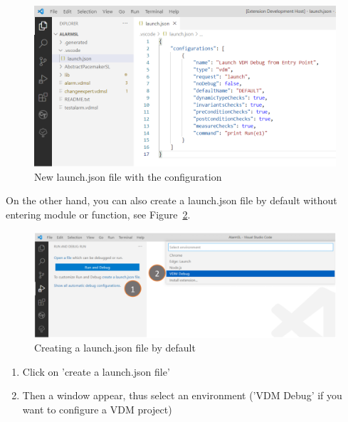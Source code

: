 \documentclass{overturerepchap}
\begin{document}
\begin{figure}[htp]
\begin{center}
  \includegraphics[width=460px]{snapshots/New .json file with the VDM Run Configuration.png}
  \caption{New launch.json file with the configuration}
  \label{fig:userguide:new.jsonFile}
\end{center}
\end{figure}

\cleardoublepage
On the other hand, you can also create a launch.json file by default without entering module or function, see Figure~\ref{fig:userguide:DefaultLaunch.json}.

\begin{figure}[htp]
\begin{center}
  \includegraphics[width=460px]{snapshots/Creating a launch.json by default.png}
  \caption{Creating a launch.json file by default}
  \label{fig:userguide:DefaultLaunch.json}
\end{center}
\end{figure}

\begin{enumerate}
    \item Click on 'create a launch.json file'
    \item Then a window appear, thus select an environment ('VDM Debug' if you want to configure a VDM project)
\end{enumerate}
\end{document}
